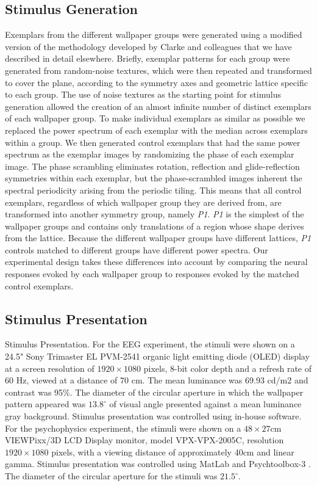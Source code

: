 \documentclass[11pt, twoside]{article}
\begin{document}
\subsection*{Stimulus Generation}
Exemplars from the different wallpaper groups were generated using a modified version of the methodology developed by Clarke and colleagues\citep{RN172} that we have described in detail elsewhere\citep{RN1725}. Briefly, exemplar patterns for each group were generated from random-noise textures, which were then repeated and transformed to cover the plane, according to the symmetry axes and geometric lattice specific to each group. The use of noise textures as the starting point for stimulus generation allowed the creation of an almost infinite number of distinct exemplars of each wallpaper group. To make individual exemplars as similar as possible we replaced the power spectrum of each exemplar with the median across exemplars within a group. We then generated control exemplars that had the same power spectrum as the exemplar images by randomizing the phase of each exemplar image. The phase scrambling eliminates rotation, reflection and glide-reflection symmetries within each exemplar, but the phase-scrambled images inherent the spectral periodicity arising from the periodic tiling. This means that all control exemplars, regardless of which wallpaper group they are derived from, are transformed into another symmetry group, namely \textit{P1}. \textit{P1} is the simplest of the wallpaper groups and contains only translations of a region whose shape derives from the lattice. Because the different wallpaper groups have different lattices, \textit{P1} controls matched to different groups have different power spectra. Our experimental design takes these differences into account by comparing the neural responses evoked by each wallpaper group to responses evoked by the matched control exemplars.

\subsection*{Stimulus Presentation}
Stimulus Presentation. For the EEG experiment, the stimuli were shown on a 24.5" Sony Trimaster EL PVM-2541 organic light emitting diode (OLED) display at a screen resolution of $1920\times1080$ pixels, 8-bit color depth and a refresh rate of 60 Hz, viewed at a distance of 70 cm. The mean luminance was 69.93 cd/m2 and contrast was 95\%. The diameter of the circular aperture in which the wallpaper pattern appeared was $13.8^\circ$ of visual angle presented against a mean luminance gray background. Stimulus presentation was controlled using in-house software. For the psychophysics experiment, the stimuli were shown on a $48 \times 27$cm VIEWPixx/3D LCD Display monitor, model VPX-VPX-2005C, resolution $1920 \times 1080$ pixels, with a viewing distance of approximately 40cm and linear gamma. Stimulus presentation was controlled using MatLab and Psychtoolbox-3 \citep{kleiner2007,brainard1997spatial}. The diameter of the circular aperture for the stimuli was $21.5^\circ$.
\end{document}
